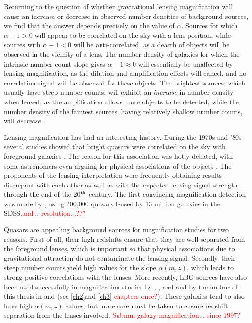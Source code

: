 Returning to the question of whether gravitational lensing magnification will cause an increase or decrease in observed number densities of background sources, we find that the answer depends precisely on the value of $\alpha$. Sources for which $\alpha -1 > 0$ will appear to be correlated on the sky with a lens position, while sources with $\alpha -1 < 0$ will be anti-correlated, as a dearth of objects will be observed in the vicinity of a lens.  The number density of galaxies for which the intrinsic number count slope gives $\alpha -1 \approx 0$ will essentially be unaffected by lensing magnification, as the dilution and amplification effects will cancel, and no correlation signal will be observed for these objects. The brightest sources, which usually have steep number counts, will exhibit an {\it increase} in number density when lensed, as the amplification allows more objects to be detected, while the number density of the faintest sources, having relatively shallow number counts, will {\it decrease} \citep{Narayan89,Scranton05}.

Lensing magnification has had an interesting history. During the 1970s and '80s several studies showed that bright quasars were correlated on the sky with foreground galaxies \citep{SeldnerPeebles79,Arp81,Webster88,Narayan89}. The reason for this association was hotly debated, with some astronomers even arguing for physical associations of the objects \citep[e.g.][]{Arp87}. The proponents of the lensing interpretation were frequently obtaining results discrepant with each other as well as with the expected lensing signal strength \citep[see e.g.][]{Schneider92} through the end of the 20$^{\rm th}$ century. The first convincing magnification detection was made by \citet{Scranton05}, using 200,000 quasars lensed by 13 million galaxies in the \acf{SDSS}.\textcolor{red}{and... resolution...???}

Quasars are appealing background sources for magnification studies for two reasons. First of all, their high redshifts ensure that they are well separated from the foreground lenses, which is important so that physical associations due to gravitational attraction do not contaminate the lensing signal. Secondly, their steep number counts yield high values for the slope $\alpha(m,z)$, which leads to strong positive correlations with the lenses. More recently, \acf{LBG} sources have also been used successfully in magnification studies by \citet{Hildebrandt09b}, \citet{Morrison12}, and \citet{Hildebrandt13} and by the author of this thesis in \citet{Ford12} and \citet{Ford14} (see \autoref{ch2}and \autoref{ch3} \textcolor{red}{chapters once?}). These galaxies tend to also have high $\alpha(m,z)$ values, but more care must be taken to ensure redshift separation from the lenses involved. \textcolor{red}{Submm galaxy magnification... since 1997?}

